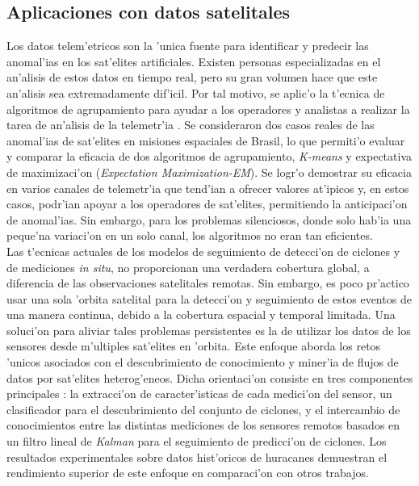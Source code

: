 \subsection{Aplicaciones con datos satelitales}
\noindent
Los datos telem'etricos son la 'unica fuente para identificar y predecir las anomal'ias en los sat'elites artificiales. Existen personas especializadas en el an'alisis de estos datos en tiempo real, pero su gran volumen hace que este an'alisis sea extremadamente dif'icil. Por tal motivo, se aplic'o la t'ecnica de algoritmos de agrupamiento para ayudar a los operadores y analistas a realizar la tarea de an'alisis de la telemetr'ia \cite{azevedo_applying_2012}. Se consideraron dos casos reales de las anomal'ias de sat'elites en misiones espaciales de Brasil, lo que permiti'o evaluar y comparar la eficacia de dos algoritmos de agrupamiento, \emph{K-means} y expectativa de maximizaci'on (\emph{Expectation Maximization-EM}). Se logr'o demostrar su eficacia en varios canales de telemetr'ia que tend'ian a ofrecer valores at'ipicos y, en estos casos, podr'ian apoyar a los operadores de sat'elites, permitiendo la anticipaci'on de anomal'ias. Sin embargo, para los problemas silenciosos, donde solo hab'ia una peque'na variaci'on en un solo canal, los algoritmos no eran tan eficientes.\\

Las t'ecnicas actuales de los modelos de seguimiento de detecci'on de ciclones y de mediciones \emph{in situ}, no proporcionan una verdadera cobertura global, a diferencia de las observaciones satelitales remotas. Sin embargo, es poco pr'actico usar una sola 'orbita satelital para la detecci'on y seguimiento de estos eventos de una manera continua, debido a la cobertura espacial y temporal limitada. Una soluci'on para aliviar tales problemas persistentes es la de utilizar los datos de los sensores desde m'ultiples sat'elites en 'orbita. Este enfoque aborda los retos 'unicos asociados con el descubrimiento de conocimiento y miner'ia de flujos de datos por sat'elites heterog'eneos. Dicha orientaci'on consiste en tres componentes principales \cite{ho_automated_2008}: la extracci'on de caracter'isticas de cada medici'on del sensor, un clasificador para el descubrimiento del conjunto de ciclones, y el intercambio de conocimientos entre las distintas mediciones de los sensores remotos basados en un filtro lineal de \emph{Kalman} para el seguimiento de predicci'on de ciclones. Los resultados experimentales sobre datos hist'oricos de huracanes demuestran el rendimiento superior de este enfoque en comparaci'on con otros trabajos\cite{Dvorak_1984,Sinclair1997}.\\

